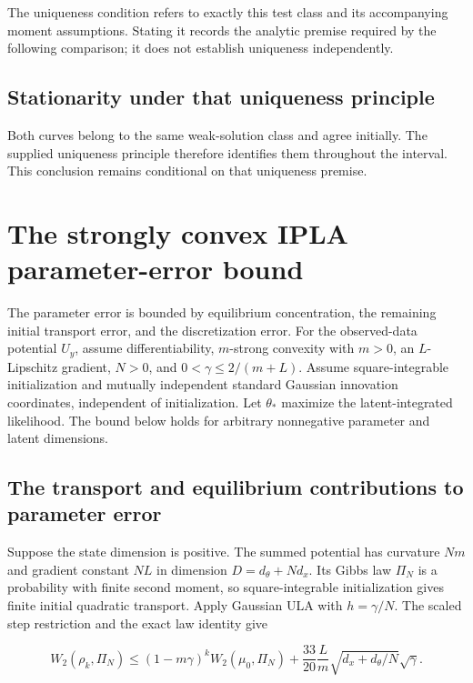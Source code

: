 \documentclass[11pt,a4paper]{article}
\begin{document}
The uniqueness condition refers to exactly this test class and its accompanying moment assumptions. Stating it records the analytic premise required by the following comparison; it does not establish uniqueness independently.


\subsection{\texorpdfstring{Stationarity under that uniqueness principle}{Stationarity under that uniqueness principle}}


Both curves belong to the same weak-solution class and agree initially. The supplied uniqueness principle therefore identifies them throughout the interval. This conclusion remains conditional on that uniqueness premise.


\section{\texorpdfstring{The strongly convex IPLA parameter-error bound}{The strongly convex IPLA parameter-error bound}}


The parameter error is bounded by equilibrium concentration, the remaining initial transport error, and the discretization error. For the observed-data potential \(U_y\), assume differentiability, \(m\)-strong convexity with \(m>0\), an \(L\)-Lipschitz gradient, \(N>0\), and \(0<\gamma\le2/(m+L)\). Assume square-integrable initialization and mutually independent standard Gaussian innovation coordinates, independent of initialization. Let \(\theta_*\) maximize the latent-integrated likelihood. The bound below holds for arbitrary nonnegative parameter and latent dimensions.


\subsection{\texorpdfstring{The transport and equilibrium contributions to parameter error}{The transport and equilibrium contributions to parameter error}}


Suppose the state dimension is positive. The summed potential has curvature \(Nm\) and gradient constant \(NL\) in dimension \(D=d_\theta+Nd_x\). Its Gibbs law \(\Pi_N\) is a probability with finite second moment, so square-integrable initialization gives finite initial quadratic transport. Apply Gaussian ULA with \(h=\gamma/N\). The scaled step restriction and the exact law identity give

\[W_2(\rho_k,\Pi_N)\le(1-m\gamma)^kW_2(\mu_0,\Pi_N)+\frac{33}{20}\frac Lm\sqrt{d_x+d_\theta/N}\sqrt\gamma.\]
\end{document}
